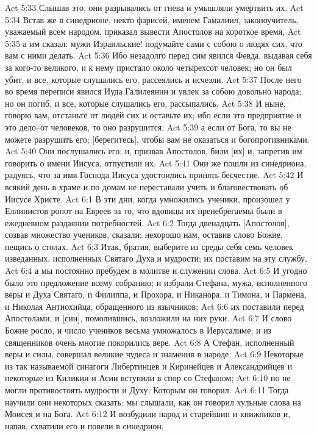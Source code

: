 Act 5:33  Слышав это, они разрывались от гнева и умышляли умертвить их.
Act 5:34  Встав же в синедрионе, некто фарисей, именем Гамалиил, законоучитель, уважаемый всем народом, приказал вывести Апостолов на короткое время,
Act 5:35  а им сказал: мужи Израильские! подумайте сами с собою о людях сих, что вам с ними делать.
Act 5:36  Ибо незадолго перед сим явился Февда, выдавая себя за кого-то великого, и к нему пристало около четырехсот человек; но он был убит, и все, которые слушались его, рассеялись и исчезли.
Act 5:37  После него во время переписи явился Иуда Галилеянин и увлек за собою довольно народа; но он погиб, и все, которые слушались его, рассыпались.
Act 5:38  И ныне, говорю вам, отстаньте от людей сих и оставьте их; ибо если это предприятие и это дело--от человеков, то оно разрушится,
Act 5:39  а если от Бога, то вы не можете разрушить его; [берегитесь], чтобы вам не оказаться и богопротивниками.
Act 5:40  Они послушались его; и, призвав Апостолов, били [их] и, запретив им говорить о имени Иисуса, отпустили их.
Act 5:41  Они же пошли из синедриона, радуясь, что за имя Господа Иисуса удостоились принять бесчестие.
Act 5:42  И всякий день в храме и по домам не переставали учить и благовествовать об Иисусе Христе.
Act 6:1  В эти дни, когда умножились ученики, произошел у Еллинистов ропот на Евреев за то, что вдовицы их пренебрегаемы были в ежедневном раздаянии потребностей.
Act 6:2  Тогда двенадцать [Апостолов], созвав множество учеников, сказали: нехорошо нам, оставив слово Божие, пещись о столах.
Act 6:3  Итак, братия, выберите из среды себя семь человек изведанных, исполненных Святаго Духа и мудрости; их поставим на эту службу,
Act 6:4  а мы постоянно пребудем в молитве и служении слова.
Act 6:5  И угодно было это предложение всему собранию; и избрали Стефана, мужа, исполненного веры и Духа Святаго, и Филиппа, и Прохора, и Никанора, и Тимона, и Пармена, и Николая Антиохийца, обращенного из язычников;
Act 6:6  их поставили перед Апостолами, и [сии], помолившись, возложили на них руки.
Act 6:7  И слово Божие росло, и число учеников весьма умножалось в Иерусалиме; и из священников очень многие покорились вере.
Act 6:8  А Стефан, исполненный веры и силы, совершал великие чудеса и знамения в народе.
Act 6:9  Некоторые из так называемой синагоги Либертинцев и Киринейцев и Александрийцев и некоторые из Киликии и Асии вступили в спор со Стефаном;
Act 6:10  но не могли противостоять мудрости и Духу, Которым он говорил.
Act 6:11  Тогда научили они некоторых сказать: мы слышали, как он говорил хульные слова на Моисея и на Бога.
Act 6:12  И возбудили народ и старейшин и книжников и, напав, схватили его и повели в синедрион.
